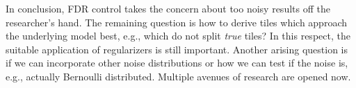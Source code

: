 In conclusion, FDR control takes the concern about too noisy results off the researcher's hand. The remaining question is how to derive tiles which approach the underlying model best, e.g., which do not split \emph{true} tiles? In this respect, the suitable application of regularizers is still important.
Another arising question is if we can incorporate other noise distributions or how we can test if the noise is, e.g., actually Bernoulli distributed. Multiple avenues of research are opened now.